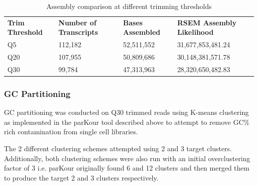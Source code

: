 \begin{table}[h]
     \begin{tabular}{@{}|l||l|l|l|@{}}
         \cmidrule(r){1-6} \cmidrule(l){8-8}
         \textbf{Trim Threshold} & \textbf{Number of Transcripts} & \textbf{Bases Assembled} & \textbf{RSEM Assembly Likelihood} \\
         \cmidrule{}
         Q5 &  112,182 & 52,511,552 & 31,677,853,481.24 \\
         Q20 & 107,955 & 50,809,686 & 30,148,381,571.78 \\
         Q30 & 99,784 & 47,313,963 &  28,320,650,482.83 \\ 
    \end{tabular}
    \caption{Assembly comparison at different trimming thresholds
    }
    \label{tab:trim_assembly}
\end{table}


\subsubsection{GC Partitioning} 

GC partitioning was conducted on Q30 trimmed reads 
using K-means clustering as implemented in the parKour tool described above 
to attempt to remove GC\% rich contamination from single cell libraries.

The 2 different clustering schemes attempted using 2 and 3 target clusters.
Additionally, both clustering schemes were also run with an initial overclustering factor of 3
i.e. parKour originally found 6 and 12 clusters and then merged them to produce the target 2 and 3 
clusters respectively. 

